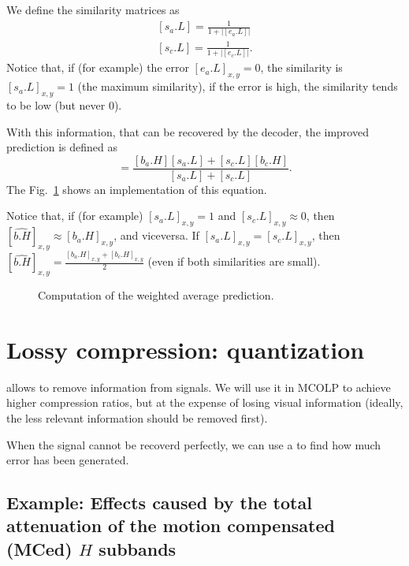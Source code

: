 We define the similarity matrices as
\begin{equation}
  \begin{array}{l}
    {[s_a.L]} = \frac{1}{1+{|[e_a.L]|}}\\
    {[s_c.L]} = \frac{1}{1+{|[e_c.L]|}}.    
  \end{array}
  \label{eq:weighted_prediction}
\end{equation}
Notice that, if (for example) the error $[e_a.L]_{x,y}=0$, the
similarity is $[s_a.L]_{x,y}=1$ (the maximum similarity), if the error
is high, the similarity tends to be low (but never $0$).

With this information, that can be recovered by the decoder, the
improved prediction is defined as
\begin{equation}
  [\hat{b.H}] = \frac{[b_a.H][s_a.L]+[s_c.L][b_c.H]}{[s_a.L]+[s_c.L]}.
\end{equation}
The Fig.~\ref{fig:weighted_average} shows an implementation of this
equation.

Notice that, if (for example) $[s_a.L]_{x,y}=1$ and
$[s_c.L]_{x,y}\approx 0$, then
$[\hat{b.H}]_{x,y} \approx [b_a.H]_{x,y}$, and viceversa. If
$[s_a.L]_{x,y}=[s_c.L]_{x,y}$, then
$[\hat{b.H}]_{x,y}=\frac{[b_a.H]_{x,y}+[b_c.H]_{x,y}}{2}$ (even if both similarities are small).

\begin{figure}
  \centering 
  \caption{Computation of the weighted average prediction.}
  \label{fig:weighted_average}
\end{figure}


\section{Lossy compression: quantization}
 allows to remove information from
signals. We will use it in MCOLP to achieve higher compression ratios,
but at the expense of losing visual information (ideally, the less
relevant information should be removed first).

When the signal cannot be recoverd perfectly, we can use a
 to find how much error
has been generated.

\subsection*{Example: Effects caused by the total attenuation of the motion compensated (MCed) $H$ subbands}

